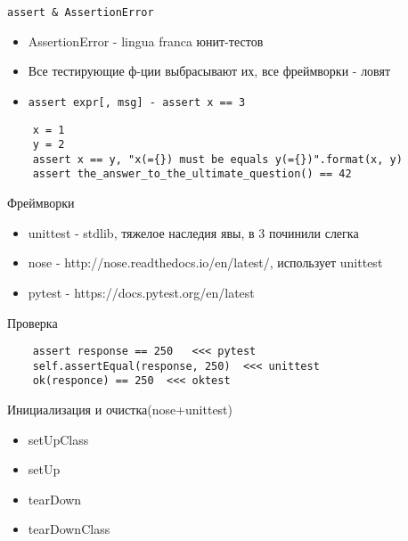 \documentclass{article}
\begin{document}
\begin{center}\lstinline!assert & AssertionError!\end{center}
\begin{itemize}
	\item AssertionError - lingua franca юнит-тестов
    \item Все тестирующие ф-ции выбрасывают их, все фреймворки - ловят
	\item \lstinline!assert expr[, msg] - assert x == 3!
\end{itemize}

\begin{verbatim}
	x = 1
	y = 2
    assert x == y, "x(={}) must be equals y(={})".format(x, y)
    assert the_answer_to_the_ultimate_question() == 42
\end{verbatim}

\begin{center}Фреймворки\end{center}
\begin{itemize}
	\item unittest - stdlib, тяжелое наследия явы, в 3 починили слегка
    \item nose - http://nose.readthedocs.io/en/latest/, использует unittest
	\item pytest - https://docs.pytest.org/en/latest
\end{itemize}

\begin{center}Проверка\end{center}
\begin{lstlisting}
    assert response == 250   <<< pytest
    self.assertEqual(response, 250)  <<< unittest
    ok(responce) == 250  <<< oktest
\end{lstlisting}
\newpage

\begin{center}Инициализация и очистка(nose+unittest)\end{center}
\begin{itemize}
	\item setUpClass
    \item setUp
	\item tearDown
    \item tearDownClass
\end{itemize}
\newpage
\end{document}
